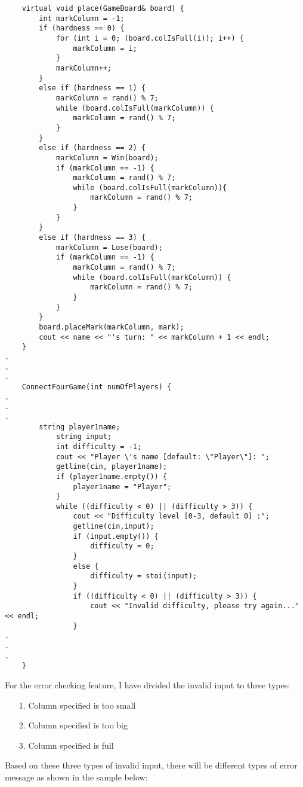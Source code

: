 \documentclass{article}
\begin{document}
\begin{verbatim}
    virtual void place(GameBoard& board) {
        int markColumn = -1;
        if (hardness == 0) {
            for (int i = 0; (board.colIsFull(i)); i++) {
                markColumn = i;
            }
            markColumn++;
        }
        else if (hardness == 1) {
            markColumn = rand() % 7;
            while (board.colIsFull(markColumn)) {
                markColumn = rand() % 7;
            }
        }
        else if (hardness == 2) {
            markColumn = Win(board);
            if (markColumn == -1) {
                markColumn = rand() % 7;
                while (board.colIsFull(markColumn)){
                    markColumn = rand() % 7;
                }
            }
        }
        else if (hardness == 3) {
            markColumn = Lose(board);
            if (markColumn == -1) {
                markColumn = rand() % 7;
                while (board.colIsFull(markColumn)) {
                    markColumn = rand() % 7;
                }
            }
        }
        board.placeMark(markColumn, mark);
        cout << name << "'s turn: " << markColumn + 1 << endl;
    }
.
.
.
    ConnectFourGame(int numOfPlayers) {
.
.
.
        string player1name;
            string input;
            int difficulty = -1;
            cout << "Player \'s name [default: \"Player\"]: ";
            getline(cin, player1name);
            if (player1name.empty()) {
                player1name = "Player";
            }
            while ((difficulty < 0) || (difficulty > 3)) {
                cout << "Difficulty level [0-3, default 0] :";
                getline(cin,input);
                if (input.empty()) {
                    difficulty = 0;
                }
                else {
                    difficulty = stoi(input);
                }
                if ((difficulty < 0) || (difficulty > 3)) {
                    cout << "Invalid difficulty, please try again..."<< endl;
                }
.
.
.
    }
\end{verbatim}
\pagebreak
For the error checking feature, I have divided the invalid input to three types:
\begin{itemize}
\item[1.]{Column specified is too small}
\item[2.]{Column specified is too big}
\item[3.]{Column specified is full}
\end{itemize}
Based on these three types of invalid input, there will be different types of error message as shown in the sample below:
\end{document}
